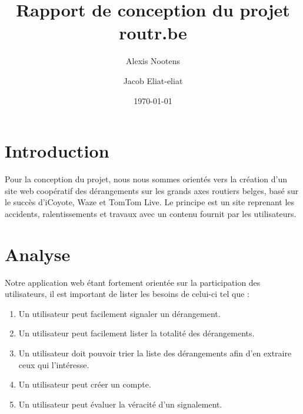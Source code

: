 \documentclass[a4paper,11pt]{article}
\title{Rapport de conception du projet routr.be}
\author{Alexis Nootens \and Jacob Eliat-eliat}
\date{\today}
\begin{document}
{\let\newpage\relax\maketitle}

\section{Introduction}

Pour la conception du projet, nous nous sommes orientés vers la création d'un site web coopératif des dérangements sur les grands axes routiers belges, basé sur le succès d'\textsf{iCoyote}, \textsf{Waze} et \textsf{TomTom Live}. Le principe est un site reprenant les accidents, ralentissements et travaux avec un contenu fournit par les utilisateurs.

\begin{center}
\end{center}

\section{Analyse}

Notre application web étant fortement orientée sur la participation des utilisateurs, il est important de lister les besoins de celui-ci tel que :

\begin{enumerate}
	\item Un utilisateur peut facilement signaler un dérangement.
	\item Un utilisateur peut facilement lister la totalité des dérangements.
	\item Un utilisateur doit pouvoir trier la liste des dérangements afin d'en extraire ceux qui l'intéresse.
	\item Un utilisateur peut créer un compte.
	\item Un utilisateur peut évaluer la véracité d'un signalement.
\end{enumerate}
\end{document}
